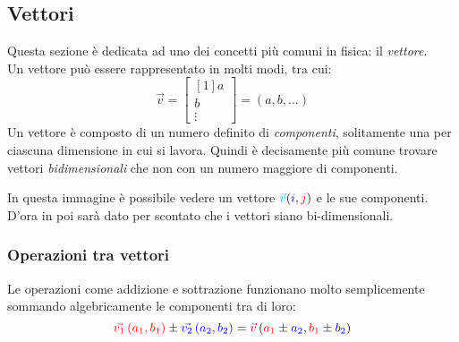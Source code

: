 \subsection{Vettori}
Questa sezione è dedicata ad uno dei concetti più comuni in fisica: il \emph{vettore}.\\
Un vettore può essere rappresentato in molti modi, tra cui:
\begin{equation*}
\vec{v} = 
\begin{bmatrix}[1]
a\\b\\\vdots
\end{bmatrix} = 
(a, b, \dots)
\end{equation*}
Un vettore è composto di un numero definito di \emph{componenti}, solitamente una per ciascuna
dimensione in cui si lavora. Quindi è decisamente più comune trovare vettori \emph{bidimensionali}
che non con un numero maggiore di componenti.\\
\begin{center}
\end{center}
In questa immagine è possibile vedere un vettore $\mathcolor{cyan}{\vec{v}}(\mathcolor{blue}{i},
\mathcolor{red}{j})$ e le sue componenti.\\[\baselineskip]
D'ora in poi sarà dato per scontato che i vettori siano bi-dimensionali.

\subsubsection{Operazioni tra vettori}
Le operazioni come addizione e sottrazione funzionano molto semplicemente sommando algebricamente
le componenti tra di loro:
\begin{equation*}
\mathcolor{red}{\vec{v_1}\left(a_1, b_1\right)} \pm 
\mathcolor{blue}{\vec{v_2}\left(a_2, b_2\right)} = 
\mathcolor{purple}{\vec{v}}\left(\mathcolor{red}{a_1}\pm \mathcolor{blue}{a_2}, 
\mathcolor{red}{b_1}\pm \mathcolor{blue}{b_2}\right)
\end{equation*}

